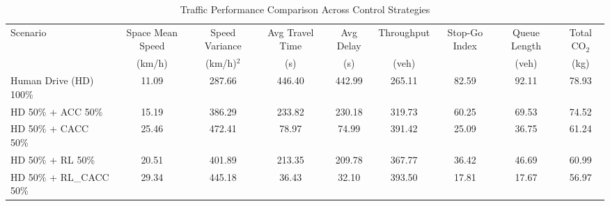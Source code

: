 \begin{table}[htbp]
\centering
\caption{Traffic Performance Comparison Across Control Strategies}
\label{tab:traffic_results}

\begin{adjustbox}{width=\textwidth}
\begin{tabular}{lcccccccc}
\hline
Scenario & Space Mean Speed & Speed Variance & Avg Travel Time & Avg Delay & Throughput & Stop-Go Index & Queue Length & Total CO$_2$ \\
 & (km/h) & (km/h)$^2$ & (s) & (s) & (veh) &  & (veh) & (kg) \\
\hline

Human Drive (HD) 100\% & 11.09 & 287.66 & 446.40 & 442.99 & 265.11 & 82.59 & 92.11 & 78.93 \\
HD 50\% + ACC 50\% & 15.19 & 386.29 & 233.82 & 230.18 & 319.73 & 60.25 & 69.53 & 74.52 \\
HD 50\% + CACC 50\% & 25.46 & 472.41 & 78.97 & 74.99 & 391.42 & 25.09 & 36.75 & 61.24 \\
HD 50\% + RL 50\% & 20.51 & 401.89 & 213.35 & 209.78 & 367.77 & 36.42 & 46.69 & 60.99 \\
HD 50\% + RL\_CACC 50\% & 29.34 & 445.18 & 36.43 & 32.10 & 393.50 & 17.81 & 17.67 & 56.97 \\

\hline
\end{tabular}
\end{adjustbox}

\end{table}